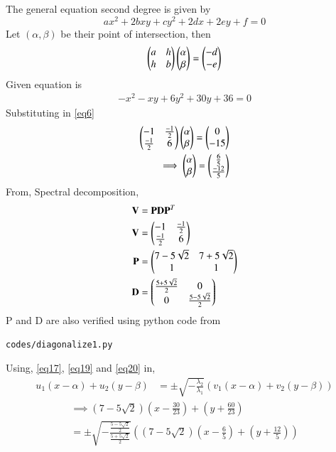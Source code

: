 \documentclass[journal,12pt,twocolumn]{IEEEtran}
\begin{document}
The general equation second degree is given by
\begin{equation}\label{eq5}
	ax^2 + 2bxy + cy^2 + 2dx + 2ey + f = 0
\end{equation}
Let $(\alpha,\beta)$ be their point of intersection, then
\begin{equation}\label{eq6}
	\begin{pmatrix} a & h\\ h & b\end{pmatrix}\begin{pmatrix}\alpha \\ \beta\end{pmatrix} = \begin{pmatrix}-d \\ -e\end{pmatrix}
\end{equation}
Given equation is
\begin{align}
	-x^2-xy+6y^2+30y+36=0
\end{align}
Substituting in \eqref{eq6}
\begin{align}
	\label{eq16}\begin{pmatrix} -1 & \frac{-1}{2}\\\frac{-1}{2} & 6\end{pmatrix}\begin{pmatrix}\alpha \\ \beta\end{pmatrix} = \begin{pmatrix}0 \\ -15\end{pmatrix} \\
	\label{eq17}\implies \begin{pmatrix}\alpha \\ \beta\end{pmatrix} =\begin{pmatrix}\frac{6}{5} \\ \frac{-12}{5}\end{pmatrix}
\end{align}
From, Spectral decomposition,
\begin{align}
	\mathbf{V} &= \mathbf{P}\mathbf{D}\mathbf{P}^T\\
	\label{eq18}\mathbf{V} &= \begin{pmatrix} -1 & \frac{-1}{2}\\\frac{-1}{2} & 6\end{pmatrix}\\
	\label{eq19}\mathbf{P} &= \begin{pmatrix}7-5 \sqrt{2} & 7+5 \sqrt{2}\\ 1 & 1\end{pmatrix}\\
	\label{eq20}\mathbf{D} &= \begin{pmatrix}\frac{5+5\sqrt{2}}{2} & 0\\ 0 & \frac{5-5\sqrt{2}}{2}\end{pmatrix}
\end{align}
P and D are also verified using python code from
\begin{lstlisting}
codes/diagonalize1.py
\end{lstlisting}
Using, \eqref{eq17}, \eqref{eq19} and \eqref{eq20} in,
\begin{align}
	u_1(x-\alpha) + u_2(y-\beta) &= \pm \sqrt{-\frac{\lambda_2}{\lambda_1}}(v_1(x-\alpha) + v_2(y-\beta))\label{eq14}
\end{align}
\begin{multline}\label{eq21}
\implies	\left(7-5 \sqrt{2}\right)\left(x-\frac{30}{23}\right) + \left(y+\frac{60}{23}\right) \\= \pm \sqrt{-\frac{\frac{5-5\sqrt{2}}{2}}{\frac{5+5\sqrt{2}}{2}}}\left(\left(7-5 \sqrt{2}\right)\left(x-\frac{6}{5}\right) + \left(y+\frac{12}{5}\right)\right)
\end{multline}
\end{document}
